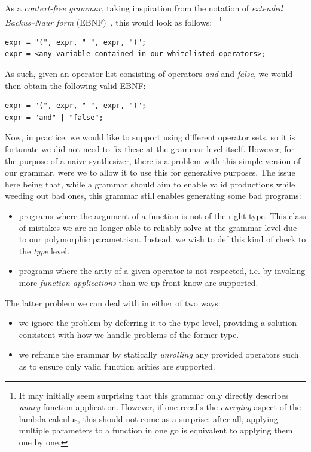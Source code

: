 \documentclass{article}
\begin{document}
As a \emph{context-free grammar},
taking inspiration from the notation of \emph{extended Backus–Naur form} (EBNF)~\citep{standard1996ebnf},
this would look as follows:%
~\footnote{
    It may initially seem surprising that this grammar only directly describes \emph{unary} function application.
    However, if one recalls the \emph{currying} aspect of the lambda calculus,
    this should not come as a surprise: after all,
    applying multiple parameters to a function in one go
    is equivalent to applying them one by one.
}

\begin{verbatim}
expr = "(", expr, " ", expr, ")";
expr = <any variable contained in our whitelisted operators>;
\end{verbatim}

As such, given an operator list consisting of operators \emph{and} and \emph{false},
we would then obtain the following valid EBNF:

\begin{verbatim}
expr = "(", expr, " ", expr, ")";
expr = "and" | "false";
\end{verbatim}

Now, in practice, we would like to support using different operator sets,
so it is fortunate we did not need to fix these at the grammar level itself.
However, for the purpose of a naive synthesizer,
there is a problem with this simple version of our grammar,
were we to allow it to use this for generative purposes.
The issue here being that,
while a grammar should aim to enable valid productions while weeding out bad ones,
this grammar still enables generating some bad programs:
\begin{itemize}
    \item programs where the argument of a function is not of the right type.
        This class of mistakes we are no longer able to reliably solve
        at the grammar level due to our polymorphic parametrism.
        Instead, we wish to def this kind of check to the \emph{type} level.
    \item programs where the arity of a given operator is not respected, i.e.
        by invoking more \emph{function applications} than we up-front know are supported.
\end{itemize}

The latter problem we can deal with in either of two ways:
\begin{itemize}
    \item we ignore the problem by deferring it to the type-level,
    providing a solution consistent with how we handle problems of the former type.
    \item we reframe the grammar by statically \emph{unrolling} any provided operators such as to ensure only valid function arities are supported.
\end{itemize}
\end{document}
